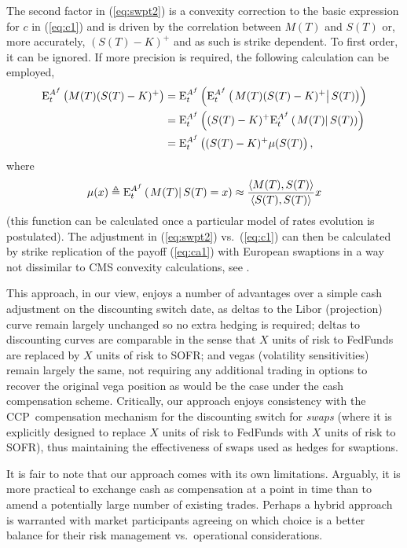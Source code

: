 \documentclass{article}
\begin{document}
The second factor in (\ref{eq:swpt2}) is a convexity correction to the basic
expression for $c$ in (\ref{eq:c1}) and is driven by the correlation between 
$M(T)$ and $S(T)$ or, more accurately, $(S(T)-K)^{+}$ and as such is strike
dependent. To first order, it can be ignored. If more precision is required,
the following calculation can be employed,%
\begin{align}
\mathrm{E}_{t}^{A^{f}}\left( M(T)(S(T)-K)^{+}\right) & =\mathrm{E}%
_{t}^{A^{f}}\left( \mathrm{E}_{t}^{A^{f}}\left( \left.
M(T)(S(T)-K)^{+}\right\vert S(T)\right) \right)   \notag \\
& =\mathrm{E}_{t}^{A^{f}}\left( (S(T)-K)^{+}\mathrm{E}_{t}^{A^{f}}\left(
\left. M(T)\right\vert S(T)\right) \right)   \notag \\
& =\mathrm{E}_{t}^{A^{f}}\left( (S(T)-K)^{+}\mu (S(T)\right) ,
\label{eq:ca1}
\end{align}%
where%
\begin{equation*}
\mu (x)\triangleq \mathrm{E}_{t}^{A^{f}}\left( \left. M(T)\right\vert
S(T)=x\right) \approx \frac{\left\langle M(T),S(T)\right\rangle }{%
\left\langle S(T),S(T)\right\rangle }x
\end{equation*}%
(this function can be calculated once a particular model of rates evolution
is postulated). The adjustment in (\ref{eq:swpt2}) vs.~(\ref{eq:c1}) can
then be calculated by strike replication of the payoff (\ref{eq:ca1}) with
European swaptions in a way not dissimilar to CMS convexity calculations,
see \cite{ap-book}.

This approach, in our view, enjoys a number of advantages over a simple cash
adjustment on the discounting switch date, as deltas to the Libor
(projection) curve remain largely unchanged so no extra hedging is required;
deltas to discounting curves are comparable in the sense that $X$ units of
risk to FedFunds are replaced by $X$ units of risk to SOFR; and vegas
(volatility sensitivities) remain largely the same, not requiring any
additional trading in options to recover the original vega position as would
be the case under the cash compensation scheme. Critically, our approach
enjoys consistency with the CCP\ compensation mechanism for the discounting
switch for \emph{swaps} (where it is explicitly designed to replace $X$
units of risk to FedFunds with $X$ units of risk to SOFR), thus maintaining
the effectiveness of swaps used as hedges for swaptions. 

It is fair to note that our approach comes with its own limitations.
Arguably, it is more practical to exchange cash as compensation at a point
in time than to amend a potentially large number of existing trades. Perhaps
a hybrid approach is warranted with market participants agreeing on which
choice is a better balance for their risk management vs.~operational
considerations.
\end{document}
